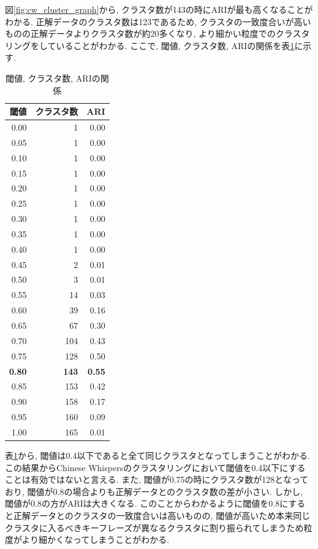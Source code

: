 図\ref{fig:cw_cluster_graph}から, クラスタ数が143の時にARIが最も高くなることがわかる. 正解データのクラスタ数は123であるため, クラスタの一致度合いが高いものの正解データよりクラスタ数が約20多くなり, より細かい粒度でのクラスタリングをしていることがわかる.  
ここで, 閾値, クラスタ数, ARIの関係を表\ref{tb:cw_result}に示す. 

\begin{table}[H]
  \caption{閾値, クラスタ数, ARIの関係}
  \label{tb:cw_result}
  \begin{center}
  \begin{tabular}{r|r|r}
    \hline
    閾値&クラスタ数&ARI\\\hline\hline
    0.00&1&0.00\\\hline
    0.05&1&0.00\\\hline
    0.10&1&0.00\\\hline
    0.15&1&0.00\\\hline
    0.20&1&0.00\\\hline
    0.25&1&0.00\\\hline
    0.30&1&0.00\\\hline
    0.35&1&0.00\\\hline
    0.40&1&0.00\\\hline
    0.45&2&0.01\\\hline
    0.50&3&0.01\\\hline
    0.55&14&0.03\\\hline
    0.60&39&0.16\\\hline
    0.65&67&0.30\\\hline
    0.70&104&0.43\\\hline
    0.75&128&0.50\\\hline
    \textbf{0.80}&\textbf{143}&\textbf{0.55}\\\hline
    0.85&153&0.42\\\hline
    0.90&158&0.17\\\hline
    0.95&160&0.09\\\hline
    1.00&165&0.01\\\hline
  \end{tabular}\end{center}
\end{table}

表\ref{tb:cw_result}から, 閾値は0.4以下であると全て同じクラスタとなってしまうことがわかる. この結果からChinese Whispersのクラスタリングにおいて閾値を0.4以下にすることは有効ではないと言える.  
また, 閾値が0.75の時にクラスタ数が128となっており, 閾値が0.8の場合よりも正解データとのクラスタ数の差が小さい. しかし, 閾値が0.8の方がARIは大きくなる. 
このことからわかるように閾値を0.8にすると正解データとのクラスタの一致度合いは高いものの, 閾値が高いため本来同じクラスタに入るべきキーフレーズが異なるクラスタに割り振られてしまうため粒度がより細かくなってしまうことがわかる. 


